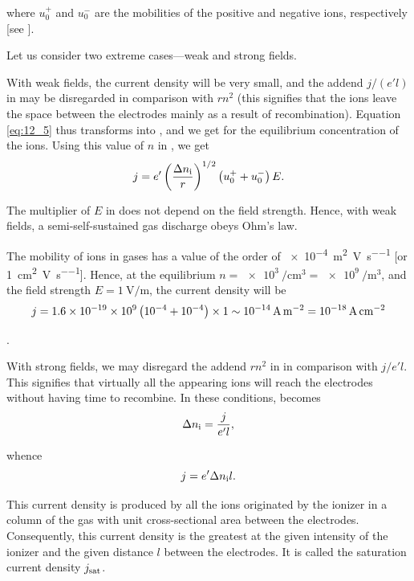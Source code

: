 \noindent
where $u_0^+$ and $u_0^-$ are the mobilities of the positive and negative ions, respectively [see ].

Let us consider two extreme cases---weak and strong fields.

With weak fields, the current density will be very small, and the addend $j/(e'l)$ in  may be disregarded in comparison with $rn^2$ (this signifies that the ions leave the space between the electrodes mainly as a result of recombination).
Equation \eqref{eq:12_5} thus transforms into , and we get  for the equilibrium concentration of the ions.
Using this value of $n$ in , we get
\begin{equation}\label{eq:12_7}
    j = e' \left(\frac{\Delta{n_{\text{i}}}}{r}\right)^{1/2} \left(u_0^+ + u_0^-\right) E.
\end{equation}

\noindent
The multiplier of $E$ in  does not depend on the field strength.
Hence, with weak fields, a semi-self-sustained gas discharge obeys Ohm's law.

The mobility of ions in gases has a value of the order of \SI{e-4}{\metre\squared\per\volt\per\second} [or \SI{1}{\centi\metre\squared\per\volt\per\second}]. Hence, at the equilibrium $n = \SI{e3}{\per\centi\metre\cubed} = \SI{e9}{\per\metre\cubed}$, and the field strength $E = \SI{1}{\volt\per\metre}$, the current density will be
\begin{equation*}
    j = \num{1.6e-19} \times \num{e9} \left(\num{e-4}+\num{e-4}\right) \times 1 \sim \SI{e-14}{\ampere\per\metre\squared} = \SI{e-18}{\ampere\per\centi\metre\squared}
\end{equation*}

.

With strong fields, we may disregard the addend $rn^2$ in  in comparison with $j/e'l$.
This signifies that virtually all the appearing ions will reach the electrodes without having time to recombine.
In these conditions,  becomes
\begin{equation*}
    \Delta{n_{\text{i}}} = \frac{j}{e' l},
\end{equation*}

\noindent
whence
\begin{equation}\label{eq:12_8}
    j = e' \Delta{n_{\text{i}}} l.
\end{equation}

\noindent
This current density is produced by all the ions originated by the ionizer in a column of the gas with unit cross-sectional area between the electrodes.
Consequently, this current density is the greatest at the given intensity of the ionizer and the given distance $l$ between the electrodes.
It is called the saturation current density $j_{\text{sat}}$.

